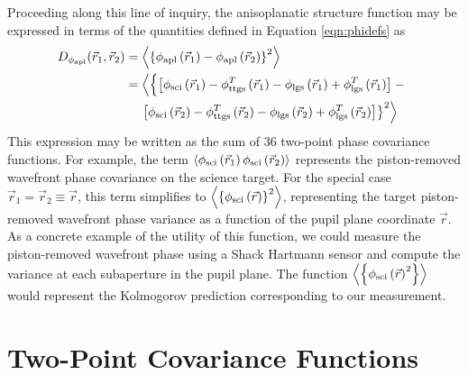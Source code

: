 Proceeding along this line of inquiry, the anisoplanatic structure
function may be expressed in terms of the quantities defined in
Equation \ref{eqn:phidefs} as
\begin{equation}\label{eqn:lgsstrfnexpansion}
\begin{split}
D_{\phi_{\rm apl}}(\vec{r}_{1},\vec{r}_{2}) & =
\left\langle \left\{\phi_{\rm apl}\left(\vec{r}_{1}\right) - 
\phi_{\rm apl}\left(\vec{r}_{2}\right)\right\}^{2}\right\rangle \\
& 
=\left\langle \left\{
\left[\phi_{\rm sci}\left(\vec{r}_{1}\right) - \phi^{T}_{\rm ttgs}\left(\vec{r}_{1}\right) - 
\phi_{\rm lgs}\left(\vec{r}_{1}\right) + \phi^{T}_{\rm lgs}\left(\vec{r}_{1}\right)\right] -
\vphantom{\left\langle\left\{\right\}^{2}\right\rangle}
\right.
\right.
\\
& \quad
\left.
\left.
\left[\phi_{\rm sci}\left(\vec{r}_{2}\right) - \phi^{T}_{\rm ttgs}\left(\vec{r}_{2}\right) - 
\phi_{\rm lgs}\left(\vec{r}_{2}\right) + \phi^{T}_{\rm lgs}\left(\vec{r}_{2}\right)\right]
\right\}^{2}\right\rangle  
\end{split}
\end{equation}
This expression may be written as the sum of 36 two-point phase
covariance functions.  For example, the term $\left\langle\phi_{\rm
  sci}\left(\vec{r}_{1}\right)\phi_{\rm
  sci}\left(\vec{r}_{2}\right)\right\rangle$ represents the
piston-removed wavefront phase covariance on the science target.  
For the special
case $\vec{r}_{1}=\vec{r}_{2}\equiv\vec{r}$, this
term simplifies to $\left\langle \left\{\phi_{\rm
  sci}\left(\vec{r}\right)\right\}^{2}\right\rangle$,
representing the target piston-removed wavefront phase variance as a
function of the pupil plane coordinate $\vec{r}$.  As a
concrete example of the utility of this function, we could measure the
piston-removed wavefront phase using a Shack Hartmann sensor and
compute the variance at each subaperture in the pupil plane.  The
function $\left\langle\left\{\phi_{\rm
  sci}\left(\vec{r}\right)^{2}\right\}\right\rangle$ would represent
the Kolmogorov prediction corresponding to our measurement.

\section{Two-Point Covariance Functions}
\label{sec:covariance}

